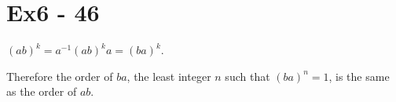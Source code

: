 \section*{Ex6 - 46}
$ (ab)^k = a^{-1}(ab)^ka = (ba)^k $.

Therefore the order of $ ba $, the least integer $ n $ such that $ (ba)^n = 1 $, is the same as the order of $ ab $.